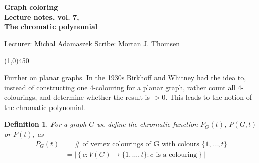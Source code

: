 \documentclass[a4paper]{article}
\theoremstyle{plain}
\newtheorem{definition}[lemma]{Definition}
\theoremstyle{myremark}
\begin{document}
\thispagestyle{empty}

\begin{center}
	{\Large\bf Graph coloring}\\
	{\bf Lecture notes, vol. 7, \\ The chromatic polynomial}\\
\end{center}
Lecturer: Michal Adamaszek \hfill Scribe: Mortan J. Thomsen
\begin{center}
\line(1,0){450}
\end{center}


\noindent Further on planar graphs. In the 1930s Birkhoff and Whitney had the idea to, instead of constructing one $4$-colouring for a planar graph, rather count all $4$-colourings, and determine whether the result is $>0$. This leads to the notion of the chromatic polynomial.
\begin{definition} For a graph $G$ we define the chromatic function $P_G(t)$, $P(G,t)$ or $P(t)$, as 
\begin{align*}
P_G(t)&=\#\text{ of vertex colourings of G with colours }\lbrace 1,\dots ,t\rbrace\\
&=\left|\left\lbrace c:V(G)\to \lbrace 1,\dots ,t\rbrace : c\text{ is a colouring}\right\rbrace\right|
\end{align*}
\end{definition}
\end{document}
